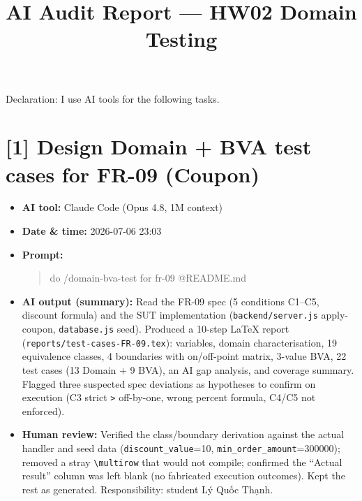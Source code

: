 \documentclass{article}
\title{AI Audit Report --- HW02 Domain Testing}
\begin{document}
\maketitle
Declaration: I use AI tools for the following tasks.

\section*{[1] Design Domain + BVA test cases for FR-09 (Coupon)}
\begin{itemize}[leftmargin=*]
  \item \textbf{AI tool:} Claude Code (Opus 4.8, 1M context)
  \item \textbf{Date \& time:} 2026-07-06 23:03
  \item \textbf{Prompt:} \begin{quote}do /domain-bva-test for fr-09 @README.md\end{quote}
  \item \textbf{AI output (summary):} Read the FR-09 spec (5 conditions C1--C5, discount
        formula) and the SUT implementation (\texttt{backend/server.js} apply-coupon,
        \texttt{database.js} seed). Produced a 10-step LaTeX report
        (\texttt{reports/test-cases-FR-09.tex}): variables, domain characterisation,
        19 equivalence classes, 4 boundaries with on/off-point matrix, 3-value BVA,
        22 test cases (13 Domain + 9 BVA), an AI gap analysis, and coverage summary.
        Flagged three suspected spec deviations as hypotheses to confirm on execution
        (C3 strict \texttt{>} off-by-one, wrong percent formula, C4/C5 not enforced).
  \item \textbf{Human review:} Verified the class/boundary derivation against the actual
        handler and seed data (\texttt{discount\_value}=10, \texttt{min\_order\_amount}=300000);
        removed a stray \texttt{\textbackslash multirow} that would not compile; confirmed
        the ``Actual result'' column was left blank (no fabricated execution outcomes).
        Kept the rest as generated. Responsibility: student Lý Quốc Thạnh.
\end{itemize}
\end{document}
